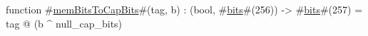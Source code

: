 function #\hyperref[zmemBitsToCapBits]{memBitsToCapBits}#(tag, b) : (bool, #\hyperref[zbits]{bits}#(256)) -> #\hyperref[zbits]{bits}#(257)  =
  tag @ (b ^ null_cap_bits)
